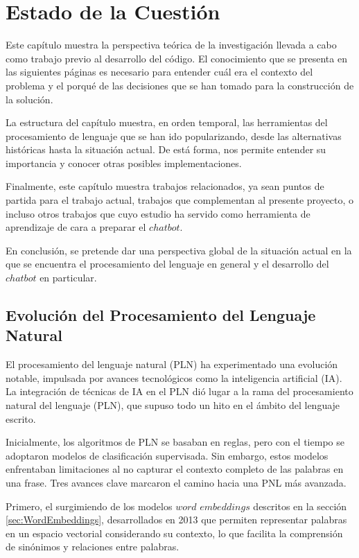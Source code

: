 \chapter{Estado de la Cuestión}
\label{cap:estadoDeLaCuestion}
Este capítulo muestra la perspectiva teórica de la investigación llevada a cabo como trabajo previo al desarrollo del código. El conocimiento que se presenta en las siguientes páginas es necesario para entender cuál era el contexto del problema y el porqué de las decisiones que se han tomado para la construcción de la solución.

La estructura del capítulo muestra, en orden temporal, las herramientas del procesamiento de lenguaje que se han ido popularizando, desde las alternativas históricas hasta la situación actual. De está forma, nos permite entender su importancia y conocer otras posibles implementaciones.

Finalmente, este capítulo muestra trabajos relacionados, ya sean puntos de partida para el trabajo actual, trabajos que complementan al presente proyecto, o incluso otros trabajos que cuyo estudio ha servido como herramienta de aprendizaje de cara a preparar el $chatbot$. 

En conclusión, se pretende dar una perspectiva global de la situación actual en la que se encuentra el procesamiento del lenguaje en general y el desarrollo del $chatbot$ en particular.  
\section{Evolución del Procesamiento del Lenguaje Natural}
El procesamiento del lenguaje natural (PLN) ha experimentado una evolución notable, impulsada por avances tecnológicos como la inteligencia artificial (IA). La integración de técnicas de IA en el PLN dió lugar a la rama del procesamiento natural del lenguaje (PLN), que supuso todo un hito en el ámbito del lenguaje escrito.

Inicialmente, los algoritmos de PLN se basaban en reglas, pero con el tiempo se adoptaron modelos de clasificación supervisada. Sin embargo, estos modelos enfrentaban limitaciones al no capturar el contexto completo de las palabras en una frase. Tres avances clave marcaron el camino hacia una PNL más avanzada. 

Primero, el surgimiendo de los modelos $word$ $embeddings$ descritos en la sección \ref{sec:WordEmbeddings}, desarrollados en 2013 que permiten representar palabras en un espacio vectorial considerando su contexto, lo que facilita la comprensión de sinónimos y relaciones entre palabras. 

